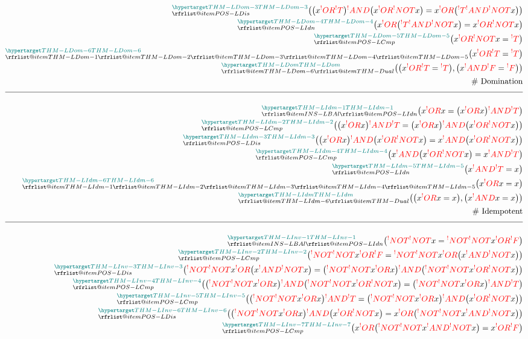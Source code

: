 \documentclass[a4paper]{article}
\makeatletter
\def\ml{\mleft}
\def\mr{\mright}
\newcommand{\eq}{=}
\newcommand{\cusand}{,}
\newcommand{\eqComment}[1]{\text{  \# #1}}
\newcommand{\n}{\\[1.5ex] \hline \nonumber \\[0ex]}
\newcommand{\m}{\nonumber \\}
\newcommand\rfrlist[1]{%
    \forcsvlist{\rfrlist@item}{#1}
}
\newcommand\rfrlist@item[1]{\rfr{#1}\\}
\newcommand{\thmlink}[2]{{}_{\substack{\rfrlist{#1}}}^{\dfn{#2}} }
\makeatother
\begin{document}
\begin{tcolorbox}
\begin{align}
\m \thmlink{POS-LDis}{THM-LDom-3} \ml(\ml(x \rfr{OR} \rfr{T}\mr) \rfr{AND} \ml(x \rfr{OR} \rfr{NOT} x\mr) \eq x \rfr{OR} \ml(\rfr{T} \rfr{AND} \rfr{NOT} x\mr)\mr)
\m \thmlink{POS-LIdn}{THM-LDom-4} \ml(x \rfr{OR} \ml(\rfr{T} \rfr{AND} \rfr{NOT} x\mr) \eq x \rfr{OR} \rfr{NOT} x\mr)
\m \thmlink{POS-LCmp}{THM-LDom-5} \ml(x \rfr{OR} \rfr{NOT} x \eq \rfr{T}\mr)
\m \thmlink{THM-LDom-1, THM-LDom-2, THM-LDom-3, THM-LDom-4, THM-LDom-5}{THM-LDom-6} \ml(x \rfr{OR} \rfr{T} \eq \rfr{T}\mr)
\m \thmlink{THM-LDom-6, THM-Dual}{THM-LDom} \ml(\ml(x \rfr{OR} \rfr{T} \eq \rfr{T}\mr) \cusand \ml(x \rfr{AND} \rfr{F} \eq \rfr{F}\mr)\mr)
\m \eqComment{Domination}
    \n \thmlink{INS-LBAl, POS-LIdn}{THM-LIdm-1} \ml(x \rfr{OR} x \eq \ml(x \rfr{OR} x\mr) \rfr{AND} \rfr{T}\mr) 
\m \thmlink{POS-LCmp}{THM-LIdm-2} \ml(\ml(x \rfr{OR} x\mr) \rfr{AND} \rfr{T} \eq \ml(x \rfr{OR} x\mr) \rfr{AND} \ml(x \rfr{OR} \rfr{NOT} x\mr)\mr) 
\m \thmlink{POS-LDis}{THM-LIdm-3} \ml(\ml(x \rfr{OR} x\mr) \rfr{AND} \ml(x \rfr{OR} \rfr{NOT} x\mr) \eq x \rfr{AND} \ml(x \rfr{OR} \rfr{NOT} x\mr)\mr) 
\m \thmlink{POS-LCmp}{THM-LIdm-4} \ml(x \rfr{AND} \ml(x \rfr{OR} \rfr{NOT} x\mr) \eq x \rfr{AND} \rfr{T}\mr) 
\m \thmlink{POS-LIdn}{THM-LIdm-5} \ml(x \rfr{AND} \rfr{T} \eq x\mr) 
\m \thmlink{THM-LIdm-1, THM-LIdm-2, THM-LIdm-3, THM-LIdm-4, THM-LIdm-5}{THM-LIdm-6} \ml(x \rfr{OR} x \eq x\mr) 
\m \thmlink{THM-LIdm-6, THM-Dual}{THM-LIdm} \ml(\ml(x \rfr{OR} x \eq x\mr) , \ml(x \rfr{AND} x \eq x\mr)\mr) 
\m \eqComment{Idempotent}
    \n \thmlink{INS-LBAl, POS-LIdn}{THM-LInv-1} \ml(\rfr{NOT} \rfr{NOT} x \eq \rfr{NOT} \rfr{NOT} x \rfr{OR} \rfr{F}\mr)
\m \thmlink{POS-LCmp}{THM-LInv-2} \ml(\rfr{NOT} \rfr{NOT} x \rfr{OR} \rfr{F} \eq \rfr{NOT} \rfr{NOT} x \rfr{OR} \ml(x \rfr{AND} \rfr{NOT} x\mr)\mr) 
\m \thmlink{POS-LDis}{THM-LInv-3} \ml(\rfr{NOT} \rfr{NOT} x \rfr{OR} \ml(x \rfr{AND} \rfr{NOT} x\mr)\eq \ml(\rfr{NOT} \rfr{NOT} x \rfr{OR} x\mr) \rfr{AND} \ml(\rfr{NOT} \rfr{NOT} x \rfr{OR} \rfr{NOT} x\mr)\mr) 
\m \thmlink{POS-LCmp}{THM-LInv-4} \ml(\ml(\rfr{NOT} \rfr{NOT} x \rfr{OR} x\mr) \rfr{AND} \ml(\rfr{NOT} \rfr{NOT} x \rfr{OR} \rfr{NOT} x\mr) \eq \ml(\rfr{NOT} \rfr{NOT} x \rfr{OR} x\mr) \rfr{AND} \rfr{T}\mr) 
\m \thmlink{POS-LCmp}{THM-LInv-5} \ml(\ml(\rfr{NOT} \rfr{NOT} x \rfr{OR} x\mr) \rfr{AND} \rfr{T} \eq \ml(\rfr{NOT} \rfr{NOT} x \rfr{OR} x\mr) \rfr{AND} \ml(x \rfr{OR} \rfr{NOT} x\mr)\mr) 
\m \thmlink{POS-LDis}{THM-LInv-6} \ml(\ml(\rfr{NOT} \rfr{NOT} x \rfr{OR} x\mr) \rfr{AND} \ml(x \rfr{OR} \rfr{NOT} x\mr) \eq x \rfr{OR} \ml(\rfr{NOT} \rfr{NOT} x \rfr{AND} \rfr{NOT} x\mr)\mr) 
\m \thmlink{POS-LCmp}{THM-LInv-7} \ml(x \rfr{OR} \ml(\rfr{NOT} \rfr{NOT} x \rfr{AND} \rfr{NOT} x\mr)\eq x \rfr{OR} \rfr{F}\mr) 

\end{align}
\end{tcolorbox}
\end{document}

